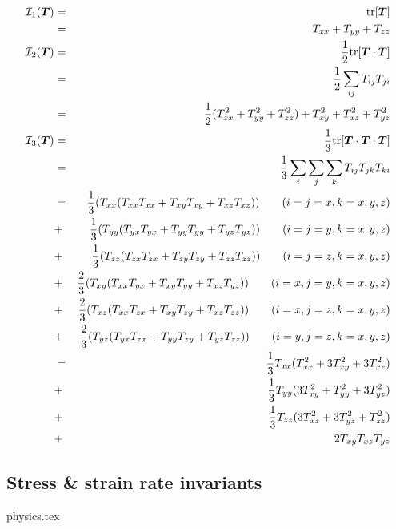 \begin{eqnarray}
{\cal I}_1({\bm T}) 
&=& {\rm tr}[\bm{T}] \\
&=& T_{xx} + T_{yy} + T_{zz} \\ 
{\cal I}_2({\bm T}) 
&=& \frac{1}{2} {\rm tr}[{\bm T}\cdot{\bm T}] \\
&=& \frac{1}{2} \sum_{ij} T_{ij} T_{ji} \\
&=& \frac{1}{2} (T_{xx}^2 + T_{yy}^2 + T_{zz}^2) + T_{xy}^2 + T_{xz}^2 + T_{yz}^2 \\ 
{\cal I}_3({\bm T}) 
&=& \frac{1}{3} {\rm tr}[{\bm T}\cdot{\bm T}\cdot {\bm T}]   \\
&=& \frac{1}{3}\sum_i\sum_j \sum_k T_{ij} T_{jk} T_{ki}  \\
&=& \frac{1}{3} (T_{xx} ( T_{xx}T_{xx} + T_{xy}T_{xy} + T_{xz}T_{xz} )) \qquad (i=j=x,k=x,y,z)\nonumber\\ 
&+& \frac{1}{3} (T_{yy} ( T_{yx}T_{yx} + T_{yy}T_{yy} + T_{yz}T_{yz} )) \qquad (i=j=y,k=x,y,z)\nonumber\\ 
&+& \frac{1}{3} (T_{zz} ( T_{zx}T_{zx} + T_{zy}T_{zy} + T_{zz}T_{zz} )) \qquad (i=j=z,k=x,y,z)\nonumber\\ 
&+& \frac{2}{3} (T_{xy} ( T_{xx}T_{yx} + T_{xy}T_{yy} + T_{xz}T_{yz} )) \qquad (i=x,j=y,k=x,y,z)\nonumber\\ 
&+& \frac{2}{3} (T_{xz} ( T_{xx}T_{zx} + T_{xy}T_{zy} + T_{xz}T_{zz} )) \qquad (i=x,j=z,k=x,y,z)\nonumber\\ 
&+& \frac{2}{3} (T_{yz} ( T_{yx}T_{zx} + T_{yy}T_{zy} + T_{yz}T_{zz} )) \qquad (i=y,j=z,k=x,y,z)\nonumber\\ 
&=& \frac{1}{3} T_{xx} (  T_{xx}^2 + 3 T_{xy}^2 + 3 T_{xz}^2  )     \nonumber\\
&+& \frac{1}{3} T_{yy} (3 T_{xy}^2 +   T_{yy}^2 + 3 T_{yz}^2  )     \nonumber\\
&+& \frac{1}{3} T_{zz} (3 T_{xz}^2 + 3 T_{yz}^2 +   T_{zz}^2)       \nonumber\\
&+& 2 T_{xy} T_{xz} T_{yz}  
\end{eqnarray}




\subsection{Stress \& strain rate invariants}\label{sec:stress_invariants}
\begin{flushright} {\tiny {\color{gray} physics.tex}} \end{flushright}

